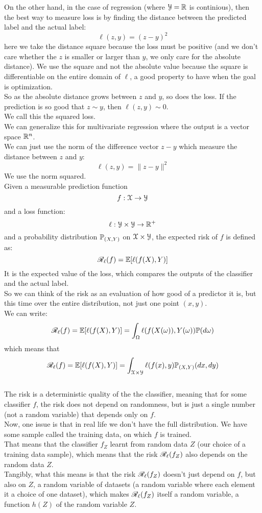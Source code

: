 \documentclass[12pt]{article}
\begin{document}
On the other hand, in the case of
regression (where $\mathcal{Y} = \mathbb{R}$
is continious),
then the best way to measure
loss is by finding the distance
between the predicted label and the
actual label:
\[ \ell(z, y) = (z - y)^2 \]
here we take the distance square
because the loss must be positive
(and we don't care whether the
$z$ is smaller or larger than $y$,
we only care for the absolute distance).
We use the square and not the absolute
value because the square is differentiable
on the entire domain of $\ell$,
a good property to have when the goal
is optimization. \\
So as the absolute distance
grows between $z$ and $y$,
so does the loss.
If the prediction is so good that
$z \sim y$,
then $\ell(z, y) \sim 0$. \\
We call this the squared loss. \\

We can generalize this for 
multivariate regression
where the output is a vector space
$\mathbb{R}^n$. \\
We can just use the norm
of the difference vector $z - y$
which measure the distance
between $z$ and $y$:
\[ \ell(z, y) = \|z - y\|^2 \]
We use the norm squared. \\

Given a measurable prediction function
\[ f:\mathcal{X} \to \mathcal{Y} \]
and a loss function:
\[ \ell: \mathcal{Y} \times \mathcal{Y} \to \mathbb{R}^+ \]
and a probability distribution
$\mathbb{P}_{(X, Y)}$ on $\mathcal{X} \times \mathcal{Y}$,
the expected risk of $f$
is defined as:
\[ \mathscr{R}_\ell(f) = \mathbb{E}[\ell(f(X), Y)] \]
It is the expected value of the loss,
which compares the outputs of the classifier 
and the actual label. \\
So we can think of the risk as an evaluation
of how good of a predictor it is,
but this time over the entire distribution,
not just one point $(x, y)$. \\

We can write:
\[ \mathscr{R}_\ell(f) = \mathbb{E}[\ell(f(X), Y)] 
= \int_{\Omega} \ell(f(X(\omega)), Y(\omega)) 
\mathbb{P}(d\omega) \]
which means that
\[ \mathscr{R}_\ell(f) = \mathbb{E}[\ell(f(X), Y)] 
= \int_{\mathcal{X} \times \mathcal{Y}}
\ell(f(x), y) \mathbb{P}_{(X, Y)}(dx, dy) \] \\

The risk is a deterministic quality 
of the the classifier,
meaning that for some classifier $f$,
the risk does not depend on randomness,
but is just a single number
(not a random variable) that depends only
on $f$. \\

Now, one issue is that in real
life we don't have the full distribution.
We have some sample called the training data,
on which $f$ is trained. \\
That means that the classifier $f_Z$
learnt from random data $Z$
(our choice of a training data sample),
which means that the risk $\mathscr{R}_\ell(f_Z)$
also depends on the random data $Z$. \\
Tangibly, what this means is that
the risk $\mathscr{R}_\ell(f_Z)$
doesn't just depend on $f$,
but also on $Z$,
a random variable of datasets
(a random variable where each element 
it a choice of one dataset),
which makes $\mathscr{R}_\ell(f_Z)$
itself a random variable,
a function $h(Z)$ of the random variable $Z$. \\
\end{document}
